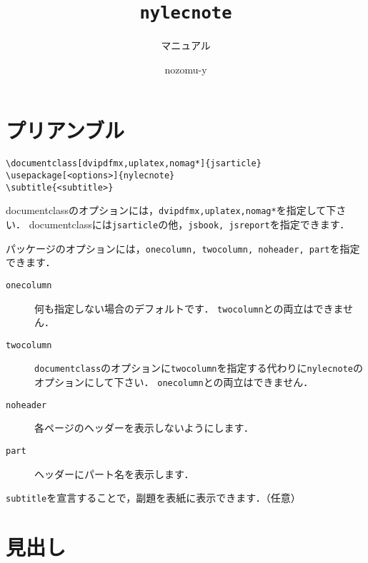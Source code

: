 \documentclass[dvipdfmx,uplatex,b5j,8pt,nomag*]{jsarticle}
\title{{\tt nylecnote}}
\subtitle{マニュアル}
\author{nozomu-y}
\begin{document}
\maketitle
\tableofcontents
\newpage

\section{プリアンブル}
\begin{lstlisting}
\documentclass[dvipdfmx,uplatex,nomag*]{jsarticle}
\usepackage[<options>]{nylecnote}
\subtitle{<subtitle>}
\end{lstlisting}

documentclassのオプションには，{\tt dvipdfmx,uplatex,nomag*}を指定して下さい．
documentclassには{\tt jsarticle}の他，{\tt jsbook, jsreport}を指定できます．

パッケージのオプションには，{\tt onecolumn, twocolumn, noheader, part}を指定できます．
\begin{description}
    \item[{\tt onecolumn}] 何も指定しない場合のデフォルトです．
        {\tt twocolumn}との両立はできません．
    \item[{\tt twocolumn}] {\tt documentclass}のオプションに{\tt twocolumn}を指定する代わりに{\tt nylecnote}のオプションにして下さい．
        {\tt onecolumn}との両立はできません．
    \item[{\tt noheader}] 各ページのヘッダーを表示しないようにします．
    \item[{\tt part}] ヘッダーにパート名を表示します．
\end{description}

{\tt subtitle}を宣言することで，副題を表紙に表示できます．（任意）

\section{見出し}
\end{document}
